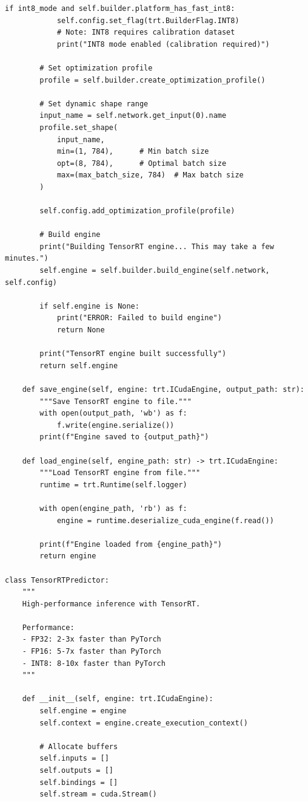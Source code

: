 \begin{lstlisting}[style=python, caption=TensorRT optimization for NVIDIA GPUs]
        if int8_mode and self.builder.platform_has_fast_int8:
            self.config.set_flag(trt.BuilderFlag.INT8)
            # Note: INT8 requires calibration dataset
            print("INT8 mode enabled (calibration required)")

        # Set optimization profile
        profile = self.builder.create_optimization_profile()

        # Set dynamic shape range
        input_name = self.network.get_input(0).name
        profile.set_shape(
            input_name,
            min=(1, 784),      # Min batch size
            opt=(8, 784),      # Optimal batch size
            max=(max_batch_size, 784)  # Max batch size
        )

        self.config.add_optimization_profile(profile)

        # Build engine
        print("Building TensorRT engine... This may take a few minutes.")
        self.engine = self.builder.build_engine(self.network, self.config)

        if self.engine is None:
            print("ERROR: Failed to build engine")
            return None

        print("TensorRT engine built successfully")
        return self.engine

    def save_engine(self, engine: trt.ICudaEngine, output_path: str):
        """Save TensorRT engine to file."""
        with open(output_path, 'wb') as f:
            f.write(engine.serialize())
        print(f"Engine saved to {output_path}")

    def load_engine(self, engine_path: str) -> trt.ICudaEngine:
        """Load TensorRT engine from file."""
        runtime = trt.Runtime(self.logger)

        with open(engine_path, 'rb') as f:
            engine = runtime.deserialize_cuda_engine(f.read())

        print(f"Engine loaded from {engine_path}")
        return engine

class TensorRTPredictor:
    """
    High-performance inference with TensorRT.

    Performance:
    - FP32: 2-3x faster than PyTorch
    - FP16: 5-7x faster than PyTorch
    - INT8: 8-10x faster than PyTorch
    """

    def __init__(self, engine: trt.ICudaEngine):
        self.engine = engine
        self.context = engine.create_execution_context()

        # Allocate buffers
        self.inputs = []
        self.outputs = []
        self.bindings = []
        self.stream = cuda.Stream()


\end{lstlisting}
